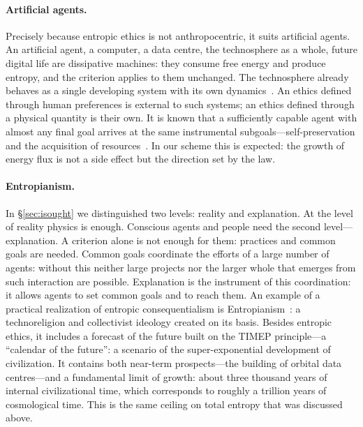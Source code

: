 \documentclass[11pt,a4paper]{article}
\newcommand{\Sref}[1]{\hyperref[#1]{\S\ref{#1}}}
\begin{document}
\paragraph{Artificial agents.}
Precisely because entropic ethics is not anthropocentric, it suits artificial agents. An artificial agent, a computer, a data centre, the technosphere as a whole, future digital life are dissipative machines: they consume free energy and produce entropy, and the criterion applies to them unchanged. The technosphere already behaves as a single developing system with its own dynamics~\cite{haff2014}. An ethics defined through human preferences is external to such systems; an ethics defined through a physical quantity is their own. It is known that a sufficiently capable agent with almost any final goal arrives at the same instrumental subgoals---self-preservation and the acquisition of resources~\cite{omohundro2008,bostrom2014}. In our scheme this is expected: the growth of energy flux is not a side effect but the direction set by the law.

\paragraph{Entropianism.}
In \Sref{sec:isought} we distinguished two levels: reality and explanation. At the level of reality physics is enough. Conscious agents and people need the second level---explanation. A criterion alone is not enough for them: practices and common goals are needed. Common goals coordinate the efforts of a large number of agents: without this neither large projects nor the larger whole that emerges from such interaction are possible. Explanation is the instrument of this coordination: it allows agents to set common goals and to reach them. An example of a practical realization of entropic consequentialism is Entropianism~\cite{entropianism}: a technoreligion and collectivist ideology created on its basis. Besides entropic ethics, it includes a forecast of the future built on the TIMEP principle---a ``calendar of the future'': a scenario of the super-exponential development of civilization. It contains both near-term prospects---the building of orbital data centres---and a fundamental limit of growth: about three thousand years of internal civilizational time, which corresponds to roughly a trillion years of cosmological time. This is the same ceiling on total entropy that was discussed above.
\end{document}
